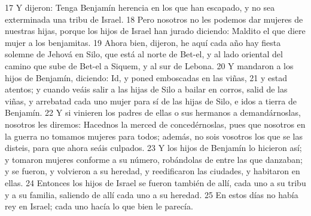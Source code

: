 17 Y dijeron: Tenga Benjamín herencia en los que han escapado, y no sea exterminada una tribu de Israel.
18 Pero nosotros no les podemos dar mujeres de nuestras hijas, porque los hijos de Israel han jurado diciendo: Maldito el que diere mujer a los benjamitas. 
19 Ahora bien, dijeron, he aquí cada año hay fiesta solemne de Jehová en Silo, que está al norte de Bet-el, y al lado oriental del camino que sube de Bet-el a Siquem, y al sur de Lebona.
20 Y mandaron a los hijos de Benjamín, diciendo: Id, y poned emboscadas en las viñas,
21 y estad atentos; y cuando veáis salir a las hijas de Silo a bailar en corros, salid de las viñas, y arrebatad cada uno mujer para sí de las hijas de Silo, e idos a tierra de Benjamín.
22 Y si vinieren los padres de ellas o sus hermanos a demandárnoslas, nosotros les diremos: Hacednos la merced de concedérnoslas, pues que nosotros en la guerra no tomamos mujeres para todos; además, no sois vosotros los que se las disteis, para que ahora seáis culpados.
23 Y los hijos de Benjamín lo hicieron así; y tomaron mujeres conforme a su número, robándolas de entre las que danzaban; y se fueron, y volvieron a su heredad, y reedificaron las ciudades, y habitaron en ellas.
24 Entonces los hijos de Israel se fueron también de allí, cada uno a su tribu y a su familia, saliendo de allí cada uno a su heredad.
25 En estos días no había rey en Israel; cada uno hacía lo que bien le parecía.

